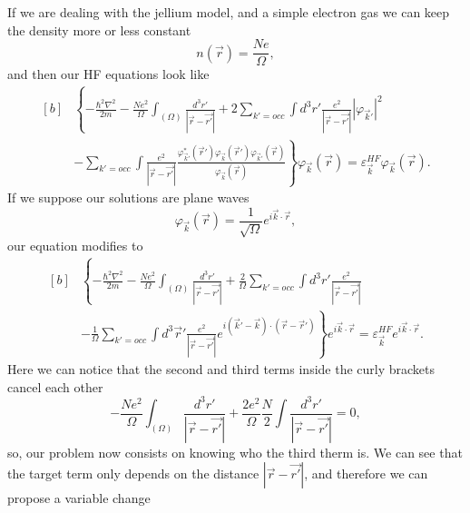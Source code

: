 
\begin{questions}
\begin{solution}
 If we are dealing with the jellium model, and a simple electron gas we can keep the density more or less constant
 \begin{equation}
   n(\vec{r}) = \frac{Ne}{\Omega},
 \end{equation}
and then our HF equations look like
\begin{equation}
  \begin{aligned}[b]
    & \left\{  -\frac{\hbar^2 \nabla^2}{2m} - \frac{Ne^2}{\Omega} \int_{(\Omega)} \frac{d^3r'}{|\vec{r} - \vec{r'}|} + 2\sum_{k'=occ} \int d^3 r' \frac{e^2}{|\vec{r} - \vec{r'}|} |\varphi_{\vec{k}'}|^2
    \right. \\
    & \left. - \sum_{k'=occ} \int \frac{e^2}{|\vec{r} - \vec{r'}|} \frac{\varphi^*_{\vec{k}'}(\vec{r}') \varphi_{\vec{k}}(\vec{r}') \varphi_{\vec{k}'}(\vec{r})}{\varphi_{\vec{k}}(\vec{r})} \right\} \varphi_{\vec{k}}(\vec{r})  = \varepsilon_{\vec{k}}^{HF} \varphi_{\vec{k}}(\vec{r}).
  \end{aligned}
\end{equation}
If we suppose our solutions are plane waves
\begin{equation}
  \varphi_{\vec{k}}(\vec{r}) = \frac{1}{\sqrt{\Omega}} e^{i\vec{k}\cdot \vec{r}},
\end{equation}
our equation modifies to
\begin{equation}
  \begin{aligned}[b]
    & \left\{  -\frac{\hbar^2 \nabla^2}{2m} - \frac{Ne^2}{\Omega} \int_{(\Omega)} \frac{d^3r'}{|\vec{r} - \vec{r'}|} + \frac{2}{\Omega} \sum_{k'=occ} \int d^3 r' \frac{e^2}{|\vec{r} - \vec{r'}|}
    \right. \\
    & \left. - \frac{1}{\Omega}\sum_{k'=occ} \int d^3\vec{r}'\frac{e^2}{|\vec{r} - \vec{r'}|} e^{i(\vec{k}' - \vec{k})\cdot(\vec{r}- \vec{r}')} \right\} e^{i\vec{k}\cdot \vec{r}}  = \varepsilon_{\vec{k}}^{HF} e^{i\vec{k}\cdot \vec{r}}.
  \end{aligned}
\end{equation}
Here we can notice that the second and third terms inside the curly brackets cancel each other
\begin{equation}
  - \frac{Ne^2}{\Omega} \int_{(\Omega)} \frac{d^3r'}{|\vec{r} - \vec{r'}|} + \frac{2e^2}{\Omega} \frac{N}{2} \int  \frac{d^3 r'}{|\vec{r} - \vec{r'}|} = 0,
\end{equation}
so, our problem now consists on knowing who the third therm is. We can see that the target term only depends on the distance $|\vec{r} - \vec{r'}|$, and therefore we can propose a variable change

\end{solution}
\end{questions}
